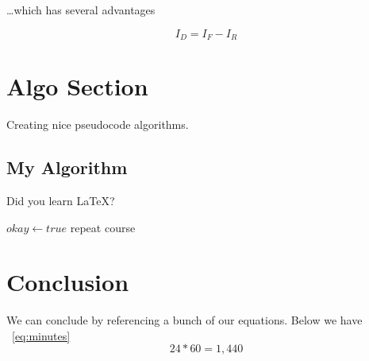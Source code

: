 \documentclass{article}
\begin{document}
\ldots which has several advantages

\begin{equation}
I_D = I_F - I_R
\end{equation}

\section{Algo Section}

Creating nice pseudocode algorithms.

\subsection{My Algorithm}

Did you learn \LaTeX?

\begin{algorithmic}
	\State $okay \gets true$
\Else
		\State repeat course
	\EndWhile
\EndIf
\end{algorithmic}

\section{Conclusion}
We can conclude by referencing a bunch of our equations. Below we have ~\ref{eq:minutes}
\begin{equation}
24 * 60 = 1,440 
\label{eq:minutes}
\end{equation}
\end{document}
